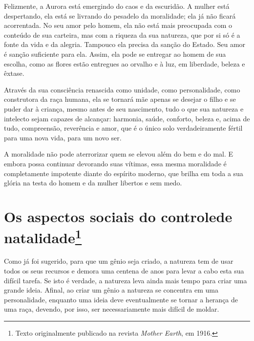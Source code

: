 Felizmente, a Aurora está emergindo do caos e da escuridão. A mulher
está despertando, ela está se livrando do pesadelo da moralidade; ela já
não ficará acorrentada. No seu amor pelo homem, ela não está mais
preocupada com o conteúdo de sua carteira, mas com a riqueza da sua
natureza, que por si só é a fonte da vida e da alegria. Tampouco ela
precisa da sanção do Estado. Seu amor é sanção suficiente para ela.
Assim, ela pode se entregar ao homem de sua escolha, como as flores
estão entregues ao orvalho e à luz, em liberdade, beleza e êxtase.

Através da sua consciência renascida como unidade, como personalidade,\label{renascida}
como construtora da raça humana, ela se tornará mãe apenas se desejar o
filho e se puder dar à criança, mesmo antes de seu nascimento, tudo o
que sua natureza e intelecto sejam capazes de alcançar: harmonia, saúde,
conforto, beleza e, acima de tudo, compreensão, reverência e amor, que é
o único solo verdadeiramente fértil para uma nova vida, para um novo
ser.

A moralidade não pode aterrorizar quem se elevou além do bem e do mal. E
embora possa continuar devorando suas vítimas, essa mesma moralidade é
completamente impotente diante do espírito moderno, que brilha em toda a
sua glória na testa do homem e da mulher libertos e sem medo.

\chapter[Os aspectos sociais do controle de natalidade]{Os aspectos sociais do controle\break de natalidade\footnote{Texto
  originalmente publicado na revista \emph{Mother Earth}, em 1916.}}
\label{ref4}

Como já foi sugerido, para que um gênio seja criado, a natureza tem de
usar todos os seus recursos e demora uma centena de anos para levar a
cabo esta sua difícil tarefa. Se isto é verdade, a natureza leva ainda
mais tempo para criar uma grande ideia. Afinal, ao criar um gênio a
natureza se concentra em uma personalidade, enquanto uma ideia deve
eventualmente se tornar a herança de uma raça, devendo, por isso, ser
necessariamente mais difícil de moldar.

